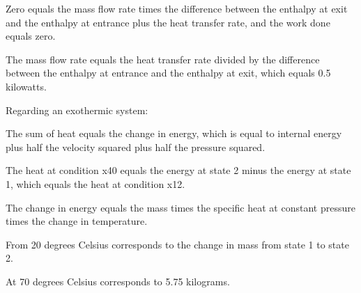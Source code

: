 Zero equals the mass flow rate times the difference between the enthalpy at exit and the enthalpy at entrance plus the heat transfer rate, and the work done equals zero.

The mass flow rate equals the heat transfer rate divided by the difference between the enthalpy at entrance and the enthalpy at exit, which equals 0.5 kilowatts.

Regarding an exothermic system:

The sum of heat equals the change in energy, which is equal to internal energy plus half the velocity squared plus half the pressure squared.

The heat at condition x40 equals the energy at state 2 minus the energy at state 1, which equals the heat at condition x12.

The change in energy equals the mass times the specific heat at constant pressure times the change in temperature.

From 20 degrees Celsius corresponds to the change in mass from state 1 to state 2.

At 70 degrees Celsius corresponds to 5.75 kilograms.